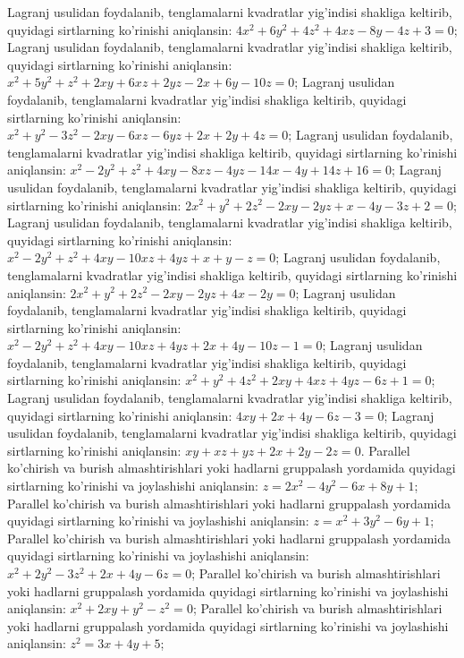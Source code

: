 Lagranj usulidan foydalanib, tenglamalarni kvadratlar yig'indisi shakliga keltirib, quyidagi sirtlarning ko'rinishi aniqlansin: $4 x^2+6 y^2+4 z^2+4 x z-8 y-4 z+3=0$;
Lagranj usulidan foydalanib, tenglamalarni kvadratlar yig'indisi shakliga keltirib, quyidagi sirtlarning ko'rinishi aniqlansin: $x^2+5 y^2+z^2+2 x y+6 x z+2 y z-2 x+6 y-10 z=0$;
Lagranj usulidan foydalanib, tenglamalarni kvadratlar yig'indisi shakliga keltirib, quyidagi sirtlarning ko'rinishi aniqlansin: $x^2+y^2-3 z^2-2 x y-6 x z-6 y z+2 x+2 y+4 z=0$;
Lagranj usulidan foydalanib, tenglamalarni kvadratlar yig'indisi shakliga keltirib, quyidagi sirtlarning ko'rinishi aniqlansin: $x^2-2 y^2+z^2+4 x y-8 x z-4 y z-14 x-4 y+14 z+16=0$;
Lagranj usulidan foydalanib, tenglamalarni kvadratlar yig'indisi shakliga keltirib, quyidagi sirtlarning ko'rinishi aniqlansin: $2 x^2+y^2+2 z^2-2 x y-2 y z+x-4 y-3 z+2=0$;
Lagranj usulidan foydalanib, tenglamalarni kvadratlar yig'indisi shakliga keltirib, quyidagi sirtlarning ko'rinishi aniqlansin: $x^2-2 y^2+z^2+4 x y-10 x z+4 y z+x+y-z=0$;
Lagranj usulidan foydalanib, tenglamalarni kvadratlar yig'indisi shakliga keltirib, quyidagi sirtlarning ko'rinishi aniqlansin: $2 x^2+y^2+2 z^2-2 x y-2 y z+4 x-2 y=0$;
Lagranj usulidan foydalanib, tenglamalarni kvadratlar yig'indisi shakliga keltirib, quyidagi sirtlarning ko'rinishi aniqlansin: $x^2-2 y^2+z^2+4 x y-10 x z+4 y z+2 x+4 y-10 z-1=0$;
Lagranj usulidan foydalanib, tenglamalarni kvadratlar yig'indisi shakliga keltirib, quyidagi sirtlarning ko'rinishi aniqlansin: $x^2+y^2+4 z^2+2 x y+4 x z+4 y z-6 z+1=0$;
Lagranj usulidan foydalanib, tenglamalarni kvadratlar yig'indisi shakliga keltirib, quyidagi sirtlarning ko'rinishi aniqlansin: $4 x y+2 x+4 y-6 z-3=0$;
Lagranj usulidan foydalanib, tenglamalarni kvadratlar yig'indisi shakliga keltirib, quyidagi sirtlarning ko'rinishi aniqlansin: $x y+x z+y z+2 x+2 y-2 z=0$.
Parallel ko'chirish va burish almashtirishlari yoki hadlarni gruppalash yordamida quyidagi sirtlarning ko'rinishi va joylashishi aniqlansin: $z=2 x^2-4 y^2-6 x+8 y+1$;
Parallel ko'chirish va burish almashtirishlari yoki hadlarni gruppalash yordamida quyidagi sirtlarning ko'rinishi va joylashishi aniqlansin: $z=x^2+3 y^2-6 y+1$;
Parallel ko'chirish va burish almashtirishlari yoki hadlarni gruppalash yordamida quyidagi sirtlarning ko'rinishi va joylashishi aniqlansin: $x^2+2 y^2-3 z^2+2 x+4 y-6 z=0$;
Parallel ko'chirish va burish almashtirishlari yoki hadlarni gruppalash yordamida quyidagi sirtlarning ko'rinishi va joylashishi aniqlansin: $x^2+2 x y+y^2-z^2=0$;
Parallel ko'chirish va burish almashtirishlari yoki hadlarni gruppalash yordamida quyidagi sirtlarning ko'rinishi va joylashishi aniqlansin: $z^2=3 x+4 y+5$;
